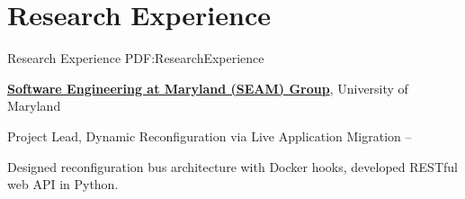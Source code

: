 
\section
{Research Experience}
{Research Experience}
{PDF:ResearchExperience}

\href{https://seam.cs.umd.edu/}
{\textbf{Software Engineering at Maryland (SEAM) Group}},
University of Maryland

\GapNoBreak
\hspace{1em} 
Project Lead, Dynamic Reconfiguration via Live Application Migration
\hfill
{} --
\begin{detail}
\SubBulletItem
Designed reconfiguration bus architecture with Docker hooks, developed RESTful web API in Python.
\end{detail}
